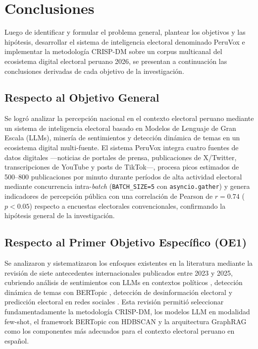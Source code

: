 \documentclass[listof=nochaptergap,12pt,times,authoryear]{report}
\begin{document}
\section{Conclusiones}
Luego de identificar y formular el problema general, plantear los objetivos y las
hipótesis, desarrollar el sistema de inteligencia electoral denominado PeruVox e
implementar la metodología CRISP-DM sobre un corpus multicanal del ecosistema
digital electoral peruano 2026, se presentan a continuación las conclusiones
derivadas de cada objetivo de la investigación.
\subsection*{Respecto al Objetivo General}
Se logró analizar la percepción nacional en el contexto electoral peruano mediante
un sistema de inteligencia electoral basado en Modelos de Lenguaje de Gran Escala
(LLMs), minería de sentimientos y detección dinámica de temas en un ecosistema
digital multi-fuente. El sistema PeruVox integra cuatro fuentes de datos digitales
—noticias de portales de prensa, publicaciones de X/Twitter, transcripciones de
YouTube y posts de TikTok—, procesa picos estimados de 500--800 publicaciones por
minuto durante períodos de alta actividad electoral mediante concurrencia
intra-\textit{batch} (\texttt{BATCH\_SIZE=5} con \texttt{asyncio.gather}) y genera
indicadores de percepción pública con una correlación de Pearson de $r = 0.74$
($p < 0.05$) respecto a encuestas electorales convencionales, confirmando la
hipótesis general de la investigación.
\subsection*{Respecto al Primer Objetivo Específico (OE1)}
Se analizaron y sistematizaron los enfoques existentes en la literatura mediante
la revisión de siete antecedentes internacionales publicados entre 2023 y 2025,
cubriendo análisis de sentimientos con LLMs en contextos políticos
\parencite{pr_alvarez2023llm_political, pr_gujral2024llm_elections},
detección dinámica de temas con BERTopic
\parencite{pr_mendonca2025bertopic_political, pr_janssens2025bertopic_llm,
pr_islam2025latent_topic}, detección de desinformación electoral
\parencite{pr_chen2024combating_misinformation} y predicción electoral en redes
sociales \parencite{pr_alvi2023twitter_election_review}. Esta revisión permitió
seleccionar fundamentadamente la metodología CRISP-DM, los modelos LLM en modalidad
few-shot, el framework BERTopic con HDBSCAN y la arquitectura GraphRAG como los
componentes más adecuados para el contexto electoral peruano en español.
\end{document}
